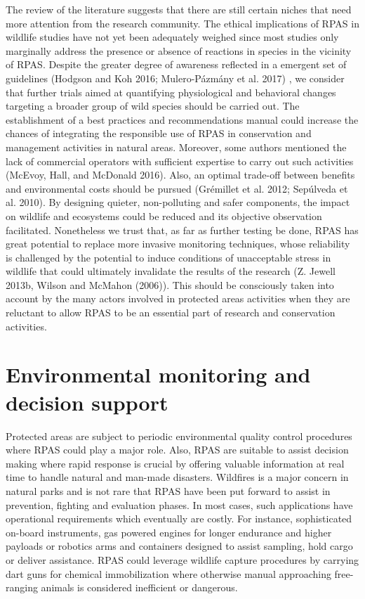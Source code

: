 \documentclass[]{interact}
\theoremstyle{plain}%
\theoremstyle{definition}
\theoremstyle{remark}
\begin{document}
The review of the literature suggests that there are still certain
niches that need more attention from the research community. The ethical
implications of RPAS in wildlife studies have not yet been adequately
weighed since most studies only marginally address the presence or
absence of reactions in species in the vicinity of RPAS. Despite the
greater degree of awareness reflected in a emergent set of guidelines
(Hodgson and Koh 2016; Mulero-Pázmány et al. 2017) , we consider that
further trials aimed at quantifying physiological and behavioral changes
targeting a broader group of wild species should be carried out. The
establishment of a best practices and recommendations manual could
increase the chances of integrating the responsible use of RPAS in
conservation and management activities in natural areas. Moreover, some
authors mentioned the lack of commercial operators with sufficient
expertise to carry out such activities (McEvoy, Hall, and McDonald
2016). Also, an optimal trade-off between benefits and environmental
costs should be pursued (Grémillet et al. 2012; Sepúlveda et al. 2010).
By designing quieter, non-polluting and safer components, the impact on
wildlife and ecosystems could be reduced and its objective observation
facilitated. Nonetheless we trust that, as far as further testing be
done, RPAS has great potential to replace more invasive monitoring
techniques, whose reliability is challenged by the potential to induce
conditions of unacceptable stress in wildlife that could ultimately
invalidate the results of the research (Z. Jewell 2013b, Wilson and
McMahon (2006)). This should be consciously taken into account by the
many actors involved in protected areas activities when they are
reluctant to allow RPAS to be an essential part of research and
conservation activities.

\section{Environmental monitoring and decision
support}\label{environmental-monitoring-and-decision-support}

Protected areas are subject to periodic environmental quality control
procedures where RPAS could play a major role. Also, RPAS are suitable
to assist decision making where rapid response is crucial by offering
valuable information at real time to handle natural and man-made
disasters. Wildfires is a major concern in natural parks and is not rare
that RPAS have been put forward to assist in prevention, fighting and
evaluation phases. In most cases, such applications have operational
requirements which eventually are costly. For instance, sophisticated
on-board instruments, gas powered engines for longer endurance and
higher payloads or robotics arms and containers designed to assist
sampling, hold cargo or deliver assistance. RPAS could leverage wildlife
capture procedures by carrying dart guns for chemical immobilization
where otherwise manual approaching free-ranging animals is considered
inefficient or dangerous.
\end{document}
